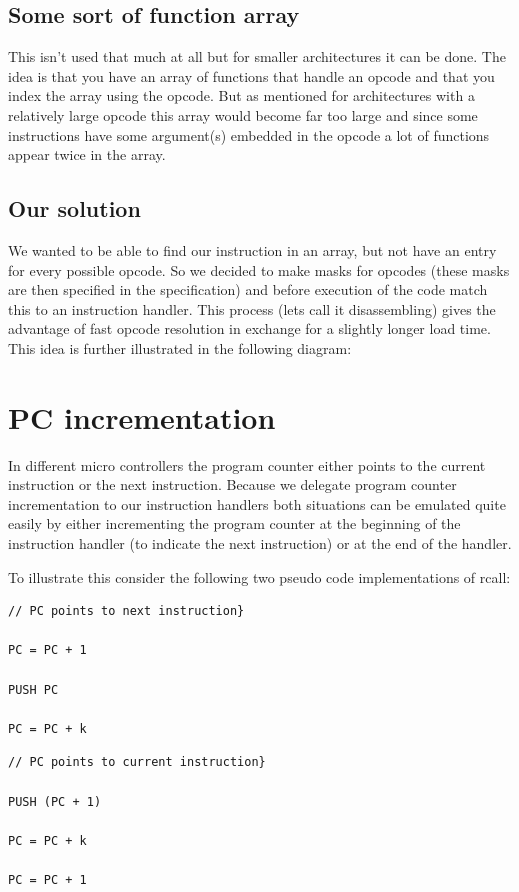 \documentclass[a4paper]{report}
\begin{document}
\subsection{Some sort of function array}
This isn't used that much at all but for smaller architectures it can be
done. The idea is that you have an array of functions that handle an
opcode and that you index the array using the opcode. But as mentioned
for architectures with a relatively large opcode this array would
become far too large and since some instructions have some argument(s)
embedded in the opcode a lot of functions appear twice in the array.

\subsection{Our solution}
We wanted to be able to find our instruction in an array, but not have
an entry for every possible opcode. So we decided to make masks for
opcodes (these masks are then specified in the specification) and
before execution of the code match this to an instruction handler. This
process (lets call it disassembling) gives the advantage of fast opcode
resolution in exchange for a slightly longer load time. This idea is
further illustrated in the following diagram:

\section[PC incrementation]{PC incrementation}
In different micro controllers the program counter either points to the
current instruction or the next instruction. Because we delegate
program counter incrementation to our instruction handlers both
situations can be emulated quite easily by either incrementing the
program counter at the beginning of the instruction handler (to
indicate the next instruction) or at the end of the handler.

To illustrate this consider the following two pseudo code
implementations of rcall:

\begin{verbatim}
// PC points to next instruction}

PC = PC + 1

PUSH PC

PC = PC + k
\end{verbatim}

\begin{verbatim}
// PC points to current instruction}

PUSH (PC + 1)

PC = PC + k

PC = PC + 1
\end{verbatim}
\end{document}
